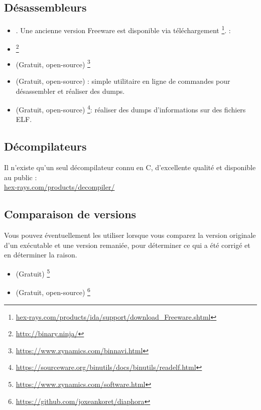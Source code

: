 \subsection{Désassembleurs}


\begin{itemize}
\item {}. Une ancienne version Freeware est disponible via téléchargement
\footnote{\href{http://go.yurichev.com/17031}{hex-rays.com/products/ida/support/download\_Freeware.shtml}}.
\ShortHotKeyCheatsheet: 

\item {}\footnote{\url{http://binary.ninja/}}

\item (Gratuit, open-source) \footnote{\url{https://www.zynamics.com/binnavi.html}}

\item (Gratuit, open-source) : simple utilitaire en ligne de commandes pour désassembler et réaliser des dumps.

\item (Gratuit, open-source) \footnote{\url{https://sourceware.org/binutils/docs/binutils/readelf.html}}:
réaliser des dumps d'informations sur des fichiers ELF.
\end{itemize}

\subsection{Décompilateurs}

Il n'existe qu'un seul décompilateur connu en C, d'excellente qualité et disponible au public :\\
\href{http://go.yurichev.com/17033}{hex-rays.com/products/decompiler/}

\subsection{Comparaison de versions}

Vous pouvez éventuellement les utiliser lorsque vous comparez la version originale d'un exécutable et une version remaniée, pour déterminer ce qui a été corrigé et en déterminer la raison.

\begin{itemize}
\item (Gratuit) \footnote{\url{https://www.zynamics.com/software.html}}

\item (Gratuit, open-source) \footnote{\url{https://github.com/joxeankoret/diaphora}}
\end{itemize}

